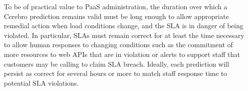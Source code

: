 


To be of practical value to PaaS administration, the duration over which a
Cerebro prediction remains valid must be long enough to allow appropriate
remedial action when load conditions change, and the SLA is in danger of being
violated.  In particular, SLAs must remain correct for at least the time
necessary to allow human responses to changing conditions such as
the commitment of more resources to web APIs that are in violation or alerts
to support staff that customers may be calling to claim SLA breach.  Ideally,
each prediction will persist as correct for several hours or more to match
staff response time to potential SLA violations.


